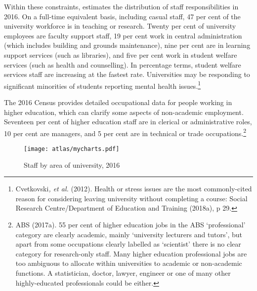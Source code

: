 \documentclass{grattan}
\begin{document}
Within these constraints,  estimates the distribution of staff responsibilities in 2016. On a full-time equivalent basis, including casual staff, 47 per cent of the university workforce is in teaching or research. Twenty per cent of university employees are faculty support staff, 19 per cent work in central administration (which includes building and grounds maintenance), nine per cent are in learning support services (such as libraries), and five per cent work in student welfare services (such as health and counselling). In percentage terms, student welfare services staff are increasing at the fastest rate. Universities may be responding to significant minorities of students reporting mental health issues.\footnote{Cvetkovski\emph{, et al.} (2012). Health or stress issues are the most commonly-cited reason for considering leaving university without completing a course: Social Research Centre/Department of Education and Training (2018a), p 29.}

The 2016 Census provides detailed occupational data for people working in higher education, which can clarify some aspects of non-academic employment. Seventeen per cent of higher education staff are in clerical or administrative roles, 10 per cent are managers, and 5 per cent are in technical or trade occupations.\footnote{ABS (2017a). 55 per cent of higher education jobs in the ABS `professional' category are clearly academic, mainly `university lecturers and tutors', but apart from some occupations clearly labelled as `scientist' there is no clear category for research-only staff. Many higher education professional jobs are too ambiguous to allocate within universities to academic or non-academic functions. A statistician, doctor, lawyer, engineer or one of many other highly-educated professionals could be either.}


    \begin{figure} %
    \caption{Staff by area of university, 2016}\label{fig:staff-by-area-of-university-2016}
    \texttt{[image: atlas/mycharts.pdf]}
    \end{figure}
\end{document}
